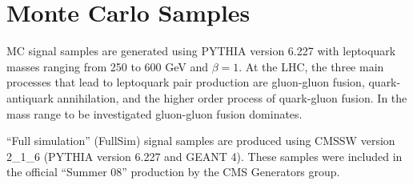
%

\section{Monte Carlo Samples} \label{sec:MCSamples}



MC signal samples are generated using PYTHIA version 6.227 with leptoquark masses ranging from 250 to 600 GeV and $\beta=1$. 
At the LHC, the three main processes that lead to leptoquark pair production are gluon-gluon fusion, 
quark-antiquark annihilation, and the higher order process of quark-gluon fusion.
In the mass range to be investigated gluon-gluon fusion dominates. 

``Full simulation'' (FullSim) signal samples are produced using 
CMSSW version 2\_1\_6 (PYTHIA version 6.227 and GEANT 4). 
These samples were included in the official ``Summer 08'' production by the CMS Generators group.

